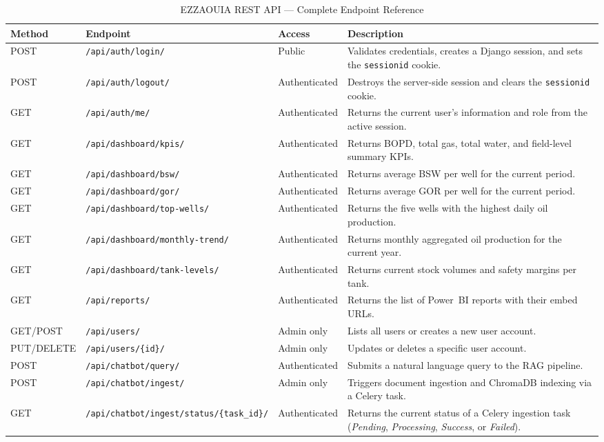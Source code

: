 \begin{sloppypar}
\begin{table}[H]
\centering
\caption{EZZAOUIA REST API --- Complete Endpoint Reference}
\label{tab:api_endpoints}
\renewcommand{\arraystretch}{1.5}
\begin{tabular}{|l|l|l|p{4.5cm}|}
\hline
\rowcolor{blue!20}
\textbf{Method} & \textbf{Endpoint} & \textbf{Access} & \textbf{Description} \\
\hline
POST & \texttt{/api/auth/login/} & Public &
  Validates credentials, creates a Django session, and sets the
  \texttt{sessionid} cookie. \\
\hline
\rowcolor{gray!10}
POST & \texttt{/api/auth/logout/} & Authenticated &
  Destroys the server-side session and clears the \texttt{sessionid}
  cookie. \\
\hline
GET & \texttt{/api/auth/me/} & Authenticated &
  Returns the current user's information and role from the active
  session. \\
\hline
\rowcolor{gray!10}
GET & \texttt{/api/dashboard/kpis/} & Authenticated &
  Returns BOPD, total gas, total water, and field-level summary KPIs. \\
\hline
GET & \texttt{/api/dashboard/bsw/} & Authenticated &
  Returns average BSW per well for the current period. \\
\hline
\rowcolor{gray!10}
GET & \texttt{/api/dashboard/gor/} & Authenticated &
  Returns average GOR per well for the current period. \\
\hline
GET & \texttt{/api/dashboard/top-wells/} & Authenticated &
  Returns the five wells with the highest daily oil production. \\
\hline
\rowcolor{gray!10}
GET & \texttt{/api/dashboard/monthly-trend/} & Authenticated &
  Returns monthly aggregated oil production for the current year. \\
\hline
GET & \texttt{/api/dashboard/tank-levels/} & Authenticated &
  Returns current stock volumes and safety margins per tank. \\
\hline
\rowcolor{gray!10}
GET & \texttt{/api/reports/} & Authenticated &
  Returns the list of Power~BI reports with their embed URLs. \\
\hline
GET/POST & \texttt{/api/users/} & Admin only &
  Lists all users or creates a new user account. \\
\hline
\rowcolor{gray!10}
PUT/DELETE & \texttt{/api/users/\{id\}/} & Admin only &
  Updates or deletes a specific user account. \\
\hline
POST & \texttt{/api/chatbot/query/} & Authenticated &
  Submits a natural language query to the RAG pipeline. \\
\hline
\rowcolor{gray!10}
POST & \texttt{/api/chatbot/ingest/} & Admin only &
  Triggers document ingestion and ChromaDB indexing via a Celery task. \\
\hline
GET & \texttt{/api/chatbot/ingest/status/\{task\_id\}/} & Authenticated &
  Returns the current status of a Celery ingestion task
  (\textit{Pending}, \textit{Processing}, \textit{Success}, or
  \textit{Failed}). \\
\hline
\end{tabular}
\end{table}


\end{sloppypar}
